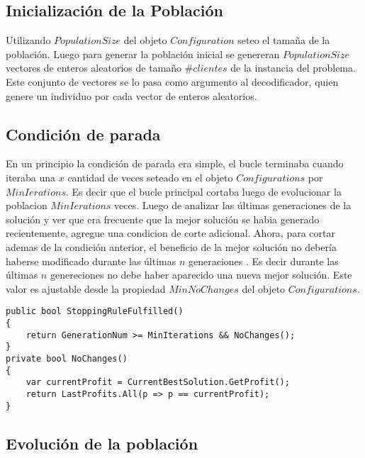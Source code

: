 \subsection{Inicialización de la Población}

Utilizando $PopulationSize$ del objeto $Configuration$ seteo el tamaña de la población. Luego para generar la población inicial se genereran $PopulationSize$ vectores de enteros aleatorios de tamaño $\#clientes$ de la instancia del problema. Este conjunto de vectores se lo pasa como argumento al decodificador, quien genere un individuo por cada vector de enteros aleatorios.

\subsection{Condición de parada}

En un principio la condición de parada era simple, el bucle terminaba cuando iteraba una $x$ cantidad de veces seteado en el objeto $Configurations$ por $MinIerations$. Es decir que el bucle principal cortaba luego de evolucionar la poblacion $MinIerations$ veces. Luego de analizar las últimas generaciones de la solución y ver que era frecuente que la mejor solución se habia generado recientemente, agregue una condicion de corte adicional. Ahora, para cortar ademas de la condición anterior, el beneficio de la mejor solución no debería haberse modificado durante las últimas $n$ generaciones . Es decir durante las últimas $n$ genereciones no debe haber aparecido una nueva mejor solución. Este valor es ajustable desde la propiedad $MinNoChanges$ del objeto $Configurations$.

\bigskip

\begin{minipage}{\textwidth}
\begin{lstlisting} 
public bool StoppingRuleFulfilled()
{ 
    return GenerationNum >= MinIterations && NoChanges();
}
private bool NoChanges()
{
	var currentProfit = CurrentBestSolution.GetProfit();
	return LastProfits.All(p => p == currentProfit);
}
\end{lstlisting}
\end{minipage}

\subsection{Evolución de la población}

